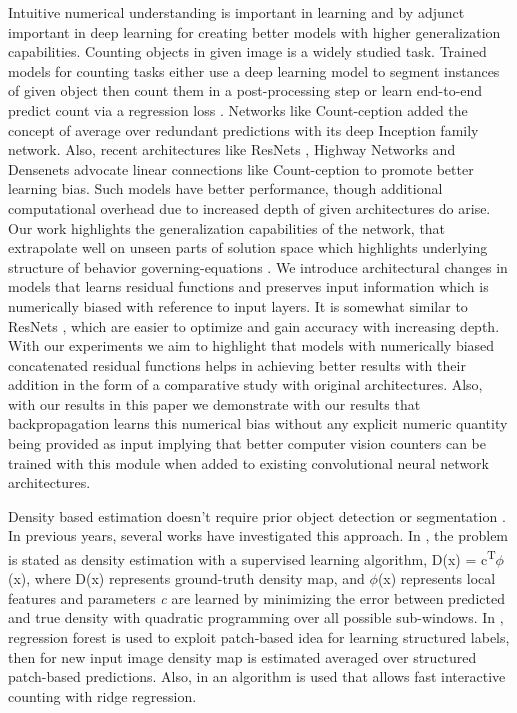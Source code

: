 \documentclass[conference]{IEEEtran}
\begin{document}
Intuitive numerical understanding is important in learning and by adjunct important in deep learning \cite{b6} for creating better models with higher generalization capabilities. Counting objects \cite{b10, b11, b12, b2, b14} in given image is a widely studied task. Trained models for counting tasks either use a deep learning model to segment instances of given object then count them in a post-processing step \cite{b15} or learn end-to-end predict count via a regression loss \cite{b2}. Networks like Count-ception \cite{b16} added the concept of average over redundant predictions with its deep Inception family network. Also, recent architectures like ResNets \cite{b17}, Highway Networks \cite{b18} and Densenets \cite{b19} advocate linear connections like Count-ception to promote better learning bias. Such models have better performance, though additional computational overhead due to increased depth of given architectures do arise. Our work highlights the generalization capabilities of the network, that extrapolate well on unseen parts of solution space which highlights underlying structure of behavior governing-equations \cite{b20}. We introduce architectural changes in models that learns residual functions and preserves input information which is numerically biased with reference to input layers. It is somewhat similar to ResNets \cite{b9}, which are easier to optimize and gain accuracy with increasing depth. With our experiments we aim to highlight that models with numerically biased concatenated residual functions helps in achieving better results with their addition in the form of a comparative study with original architectures. Also, with our results in this paper we demonstrate with our results that backpropagation learns this numerical bias without any explicit numeric quantity being provided as input implying that better computer vision counters can be trained with this module when added to existing convolutional neural network architectures.

Density based estimation doesn’t require prior object detection or segmentation \cite{b13, b21, b22}. In previous years, several works have investigated this approach. In \cite{b13}, the problem is stated as density estimation with a supervised learning algorithm, D(x) = c\textsuperscript{T}$\phi$(x), where D(x) represents  ground-truth density map, and $\phi$(x) represents  local features and parameters \textit{c} are learned by minimizing the error between predicted and true density with quadratic programming over all possible sub-windows. In \cite{b22}, regression forest is used to exploit patch-based idea for learning structured labels, then for new input image density map is estimated averaged over structured patch-based predictions. Also, in \cite{b21} an algorithm is used that allows fast interactive counting with ridge regression.
\end{document}
